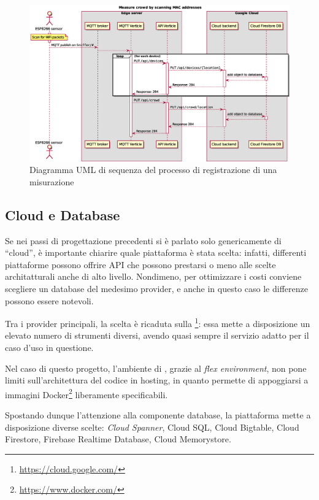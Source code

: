 \begin{figure}[H]
  \centering
  \includegraphics[width=\textwidth]{res/out/measure.eps}
  \caption{Diagramma UML di sequenza del processo di registrazione di una misurazione}%
  \label{fig:measure}
\end{figure}

\subsection{Cloud e Database}

Se nei passi di progettazione precedenti si è parlato solo genericamente di ``cloud'', è importante chiarire quale piattaforma è stata scelta:
infatti, differenti piattaforme possono offrire API che possono prestarsi o meno alle scelte architatturali anche di alto livello.
Nondimeno, per ottimizzare i costi conviene scegliere un database del medesimo provider, e anche in questo caso le differenze possono essere notevoli.

Tra i provider principali, la scelta è ricaduta sulla \footnote{\url{https://cloud.google.com/}}:
essa mette a disposizione un elevato numero di strumenti diversi, avendo quasi sempre il servizio adatto per il caso d'uso in questione.

Nel caso di questo progetto, l'ambiente di , grazie al \emph{flex environment}, non pone limiti sull'architettura del codice in hosting, in quanto permette di appoggiarsi a immagini Docker\footnote{\url{https://www.docker.com/}} liberamente specificabili.

Spostando dunque l'attenzione alla componente database, la piattaforma mette a disposizione diverse scelte:
\emph{Cloud Spanner}, {Cloud SQL}, {Cloud Bigtable}, {Cloud Firestore}, {Firebase Realtime Database}, {Cloud Memorystore}.

